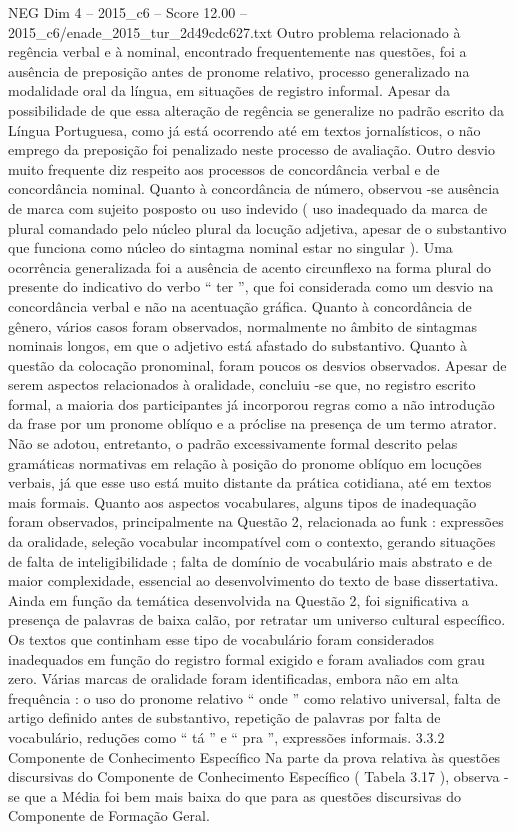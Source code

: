 \begin{textsample}{NEG Dim 4 – 2015\_c6 – Score 12.00 – 2015\_c6/enade\_2015\_tur\_2d49cdc627.txt}
Outro problema relacionado à regência verbal e à nominal, encontrado frequentemente nas questões, foi a ausência de preposição antes de pronome relativo, processo generalizado na modalidade oral da língua, em situações de registro informal.
Apesar da possibilidade de que essa alteração de regência se generalize no padrão escrito da Língua Portuguesa, como já está ocorrendo até em textos jornalísticos, o não emprego da preposição foi penalizado neste processo de avaliação.
Outro desvio muito frequente diz respeito aos processos de concordância verbal e de concordância nominal.
Quanto à concordância de número, observou -se ausência de marca com sujeito posposto ou uso indevido ( uso inadequado da marca de plural comandado pelo núcleo plural da locução adjetiva, apesar de o substantivo que funciona como núcleo do sintagma nominal estar no singular ).
Uma ocorrência generalizada foi a ausência de acento circunflexo na forma plural do presente do indicativo do verbo “ ter ”, que foi considerada como um desvio na concordância verbal e não na acentuação gráfica.
Quanto à concordância de gênero, vários casos foram observados, normalmente no âmbito de sintagmas nominais longos, em que o adjetivo está afastado do substantivo.
Quanto à questão da colocação pronominal, foram poucos os desvios observados.
Apesar de serem aspectos relacionados à oralidade, concluiu -se que, no registro escrito formal, a maioria dos participantes já incorporou regras como a não introdução da frase por um pronome oblíquo e a próclise na presença de um termo atrator.
Não se adotou, entretanto, o padrão excessivamente formal descrito pelas gramáticas normativas em relação à posição do pronome oblíquo em locuções verbais, já que esse uso está muito distante da prática cotidiana, até em textos mais formais.
Quanto aos aspectos vocabulares, alguns tipos de inadequação foram observados, principalmente na Questão 2, relacionada ao funk : expressões da oralidade, seleção vocabular incompatível com o contexto, gerando situações de falta de inteligibilidade ; falta de domínio de vocabulário mais abstrato e de maior complexidade, essencial ao desenvolvimento do texto de base dissertativa.
Ainda em função da temática desenvolvida na Questão 2, foi significativa a presença de palavras de baixa calão, por retratar um universo cultural específico.
Os textos que continham esse tipo de vocabulário foram considerados inadequados em função do registro formal exigido e foram avaliados com grau zero.
Várias marcas de oralidade foram identificadas, embora não em alta frequência : o uso do pronome relativo “ onde ” como relativo universal, falta de artigo definido antes de substantivo, repetição de palavras por falta de vocabulário, reduções como “ tá ” e “ pra ”, expressões informais. 3.3.2 Componente de Conhecimento Específico Na parte da prova relativa às questões discursivas do Componente de Conhecimento Específico ( Tabela 3.17 ), observa -se que a Média foi bem mais baixa do que para as questões discursivas do Componente de Formação Geral.

\end{textsample}
